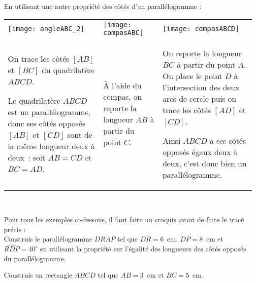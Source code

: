 \begin{methode*1}

 En utilisant une autre propriété des côtés d'un parallélogramme :
 
 \begin{exemple*1}
 
  \begin{tabularx}{\textwidth}{X|X|X}
 \qquad \texttt{[image: angleABC\_2]} & \qquad \texttt{[image: compasABC]} & \texttt{[image: compasABCD]}  \\ 
 On trace les côtés $[AB]$ et $[BC]$ du quadrilatère $ABCD$.
 
 Le quadrilatère $ABCD$ est un parallélogramme, donc ses côtés opposés $[AB]$ et $[CD]$ sont de la même longueur deux à deux : soit $AB = CD$ et $BC = AD$. & À l'aide du compas, on reporte la longueur $AB$ à partir du point $C$. & On reporte la longueur $BC$ à partir du point $A$. On place le point $D$ à l'intersection des deux arcs de cercle puis on trace les côtés $[AD]$ et $[CD]$.
 
Ainsi $ABCD$ a ses côtés opposés égaux deux à deux, c'est donc bien un parallélogramme.\\
\end{tabularx} \\
 
 \end{exemple*1}

Pour tous les exemples ci-dessous, il faut faire un croquis avant de faire le tracé précis :\\[-2.5em]

\exercice
Construis le parallélogramme $DRAP$ tel que $DR = 6$ cm, $DP = 8$ cm et $\widehat{RDP} = 40^\circ$ en utilisant la propriété sur l'égalité des longueurs des côtés opposés du parallélogramme.

\exercice
Construis un rectangle $ABCD$ tel que $AB = 3$ cm et $BC = 5$ cm.

\end{methode*1}


